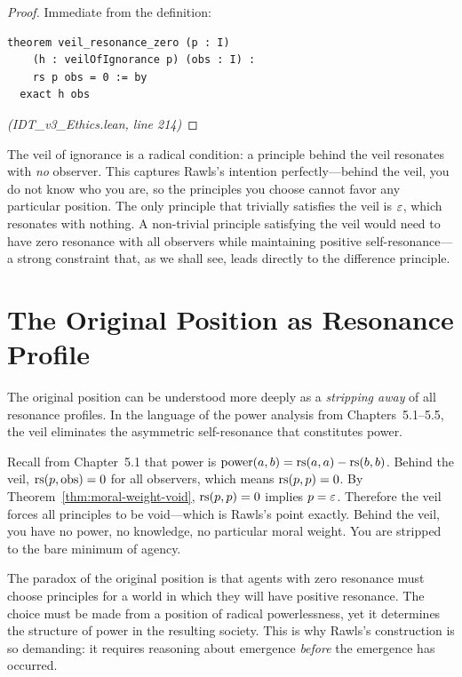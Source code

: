 \begin{proof}
Immediate from the definition:
\begin{lstlisting}
theorem veil_resonance_zero (p : I)
    (h : veilOfIgnorance p) (obs : I) :
    rs p obs = 0 := by
  exact h obs
\end{lstlisting}
\textit{(IDT\_v3\_Ethics.lean, line 214)}
\end{proof}

\begin{interpretation}
The veil of ignorance is a radical condition: a principle behind the veil
resonates with \emph{no} observer. This captures Rawls's intention perfectly---behind
the veil, you do not know who you are, so the principles you choose cannot
favor any particular position. The only principle that trivially satisfies the
veil is $\varepsilon$, which resonates with nothing. A non-trivial principle
satisfying the veil would need to have zero resonance with all observers while
maintaining positive self-resonance---a strong constraint that, as we shall see,
leads directly to the difference principle.
\end{interpretation}

\section{The Original Position as Resonance Profile}
\label{sec:original-position}

The original position can be understood more deeply as a \emph{stripping away}
of all resonance profiles. In the language of the power analysis from
Chapters~5.1--5.5, the veil eliminates the asymmetric self-resonance that
constitutes power.

\begin{remark}
Recall from Chapter~5.1 that power is $\mathrm{power}(a, b) = \mathrm{rs}(a,a) -
\mathrm{rs}(b,b)$. Behind the veil, $\mathrm{rs}(p, \mathrm{obs}) = 0$ for all observers,
which means $\mathrm{rs}(p, p) = 0$. By Theorem~\ref{thm:moral-weight-void},
$\mathrm{rs}(p, p) = 0$ implies $p = \varepsilon$. Therefore the veil forces all
principles to be void---which is Rawls's point exactly. Behind the veil,
you have no power, no knowledge, no particular moral weight. You are
stripped to the bare minimum of agency.

The paradox of the original position is that agents with zero resonance
must choose principles for a world in which they will have positive
resonance. The choice must be made from a position of radical powerlessness,
yet it determines the structure of power in the resulting society. This
is why Rawls's construction is so demanding: it requires reasoning about
emergence \emph{before} the emergence has occurred.
\end{remark}

